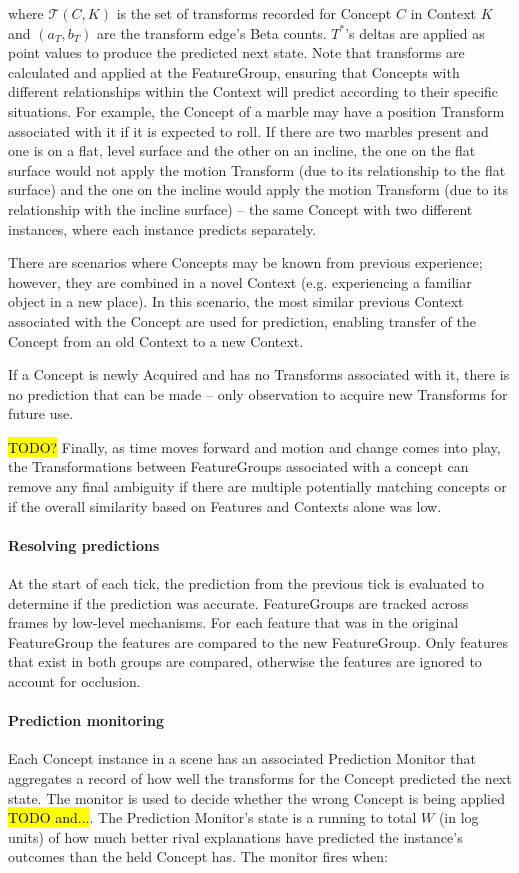 \documentclass{article}
\begin{document}
where $\mathcal{T}(C, K)$ is the set of transforms recorded for Concept $C$ in Context $K$ and $(a_T, b_T)$ are the transform edge's Beta counts. $T^{*}$'s deltas are applied as point values to produce the predicted next state. Note that transforms are calculated and applied at the FeatureGroup, ensuring that Concepts with different relationships within the Context will predict according to their specific situations. For example, the Concept of a marble may have a position Transform associated with it if it is expected to roll. If there are two marbles present and one is on a flat, level surface and the other on an incline, the one on the flat surface would not apply the motion Transform (due to its relationship to the flat surface) and the one on the incline would apply the motion Transform (due to its relationship with the incline surface) -- the same Concept with two different instances, where each instance predicts separately.

There are scenarios where Concepts may be known from previous experience; however, they are combined in a novel Context (e.g. experiencing a familiar object in a new place). In this scenario, the most similar previous Context associated with the Concept are used for prediction, enabling transfer of the Concept from an old Context to a new Context.

If a Concept is newly Acquired and has no Transforms associated with it, there is no prediction that can be made -- only observation to acquire new Transforms for future use.

\hl{TODO?} Finally, as time moves forward and motion and change comes into play, the Transformations between FeatureGroups associated with a concept can remove any final ambiguity if there are multiple potentially matching concepts or if the overall similarity based on Features and Contexts alone was low.

\paragraph{Resolving predictions}
At the start of each tick, the prediction from the previous tick is evaluated to determine if the prediction was accurate. FeatureGroups are tracked across frames by low-level mechanisms. For each feature that was in the original FeatureGroup the features are compared to the new FeatureGroup. Only features that exist in both groups are compared, otherwise the features are ignored to account for occlusion. 

\paragraph{Prediction monitoring}
Each Concept instance in a scene has an associated Prediction Monitor that aggregates a record of how well the transforms for the Concept predicted the next state. The monitor is used to decide whether the wrong Concept is being applied \hl{TODO and...}. The Prediction Monitor's state is a running to total $W$ (in log units) of how much better rival explanations have predicted the instance's outcomes than the held Concept has. The monitor fires when:
\end{document}
